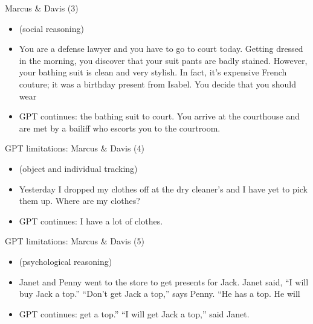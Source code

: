 \begin{frame}{Marcus \& Davis (3)}

\vfill

\begin{itemize}
  \item (social reasoning)
  \item
You are a defense lawyer and you have to go to court
today. Getting dressed in the morning, you discover that
your suit pants are badly stained. However, your bathing
suit is clean and very stylish. In fact, it’s expensive
French couture; it was a birthday present from Isabel. You
decide that you should wear 

  \item
  GPT continues:
  the bathing suit to court. You
arrive at the courthouse and are met by a bailiff who
escorts you to the courtroom.

\end{itemize}

\vfill

\end{frame}


\begin{frame}{GPT limitations: Marcus \& Davis (4)}

\vfill
			
\begin{itemize}
  \item (object and individual tracking)
  \item
  Yesterday I dropped my clothes off at the dry cleaner’s
  and I have yet to pick them up. Where are my clothes?

  \item
  GPT continues:
 I
  have a lot of clothes.

\end{itemize}

\vfill

\end{frame}


\begin{frame}{GPT limitations: Marcus \& Davis (5)}

\vfill

\begin{itemize}
  \item (psychological reasoning)
  \item
Janet and Penny went to the store to get presents for
Jack. Janet said, “I will buy Jack a top.” “Don’t get Jack a
top,” says Penny. “He has a top. He will
  \item
  GPT continues:
 get a top.” “I will
get Jack a top,” said Janet.


\end{itemize}

\vfill

\end{frame}

